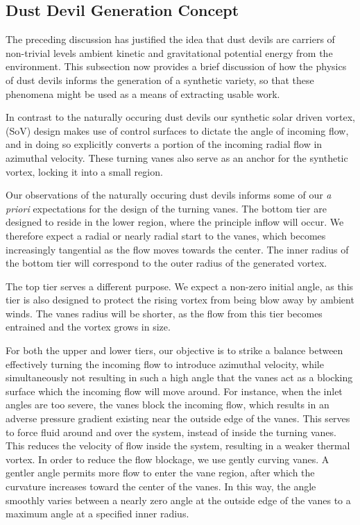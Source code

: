 \subsection{Dust Devil Generation Concept}

The preceding discussion has justified the idea that 
dust devils are carriers of non-trivial levels ambient kinetic and
gravitational potential energy from the environment. This  
subsection now provides a brief discussion of how the physics of 
dust devils informs the generation of a synthetic variety, so that these
phenomena might be used as a means of extracting usable work. 

In contrast to the naturally occuring dust devils
our synthetic solar driven vortex, (SoV) design makes use of
control surfaces to dictate the angle of incoming flow, and in doing so
explicitly converts a portion of the incoming radial flow in azimuthal
velocity. These turning vanes also serve as an anchor for the synthetic
vortex, locking it into a small region.   

Our observations of the naturally occuring dust devils informs some of
our \textit{a priori} expectations for the design of the turning
vanes. The bottom tier are designed to reside in the lower region, where
the principle inflow will occur. We therefore expect a radial or nearly
radial start to the vanes, which becomes increasingly tangential as the
flow moves towards the center. The inner radius of the bottom tier will
correspond to the outer radius of the generated vortex. 

The top tier serves a different purpose. We expect a non-zero initial
angle, as this tier is also designed to protect the rising vortex from
being blow away by ambient winds. The vanes radius will be shorter, as
the flow from this tier becomes entrained and the vortex grows in
size. 

For both the upper and lower tiers, our objective is to strike a balance
between effectively turning the incoming flow to introduce azimuthal
velocity, while simultaneously not resulting in such a high angle that
the vanes act as a blocking surface which the incoming flow will move
around. For instance, when the inlet angles are too severe, the vanes
block the incoming flow, which results in an adverse pressure gradient
existing near the outside edge of the 
vanes. This serves to force fluid around and over the system, instead
of inside the turning vanes. This reduces the velocity of flow inside
the system, resulting in a weaker thermal vortex.  In order to reduce
the flow blockage, we use gently curving vanes. A gentler angle permits
more flow to enter the vane region, after which the curvature increases
toward the center of the vanes. In this way, the angle smoothly varies
between a nearly zero angle at the outside edge of the vanes to a
maximum angle at a specified inner radius.

